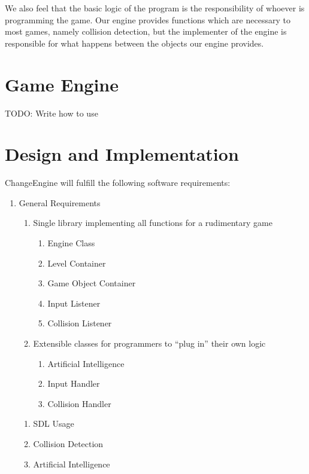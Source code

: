 \documentclass[12pt]{article}
\begin{document}
    We also feel that the basic logic of the program is the responsibility of whoever is programming the game. Our engine provides functions which are necessary to most games, namely collision detection, but the implementer of the engine is responsible for what happens between the objects our engine provides.

  \section{Game Engine}
    TODO: Write how to use

  \section{Design and Implementation}
    ChangeEngine will fulfill the following software requirements:

\begin{enumerate}
  \item General Requirements

  \begin{enumerate}
    \item Single library implementing all functions for a rudimentary game

    \begin{enumerate}
      \item Engine Class
      \item Level Container
      \item Game Object Container
      \item Input Listener
      \item Collision Listener
    \end{enumerate}

    \item Extensible classes for programmers to ``plug in'' their own logic

    \begin{enumerate}
      \item Artificial Intelligence
      \item Input Handler
      \item Collision Handler
    \end{enumerate}

  \end{enumerate}

  \begin{enumerate}
    \item SDL Usage
    \item Collision Detection
    \item Artificial Intelligence
  \end{enumerate}

\end{enumerate}
\end{document}
